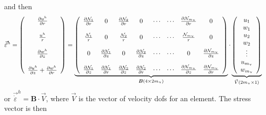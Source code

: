 and then 
\[
\vec{\dot\varepsilon}^h=
\left(
\begin{array}{c}
\frac{\partial u^h}{\partial r} \\ \\
\frac{u^h}{r} \\ \\
\frac{\partial w^h}{\partial z} \\ \\
\frac{\partial u^h}{\partial z} + \frac{\partial w^h}{\partial r} 
\end{array}
\right)
=
\underbrace{
\left(
\begin{array}{ccccccccc}
\frac{\partial {\mathcal{N}}_1}{\partial r} &  0 &  
\frac{\partial {\mathcal{N}}_2}{\partial r} &  0 & 
\cdots & \cdots &
\frac{\partial {\mathcal{N}}_{m_\upnu}}{\partial r} &  0 
\\  \\
\frac{{\mathcal{N}}_1}{r}  & 0 &  
\frac{{\mathcal{N}}_2}{r}  & 0 & 
\cdots & \cdots &
\frac{{\mathcal{N}}_{m_\upnu}}{r}  & 0  
\\  \\
0 & \frac{\partial {\mathcal{N}}_1}{\partial z}  &
0 & \frac{\partial {\mathcal{N}}_2}{\partial z}  &  
\cdots & \cdots &
0 & \frac{\partial {\mathcal{N}}_{m_\upnu}}{\partial z}   
\\ \\
\frac{\partial {\mathcal{N}}_1}{\partial z} & \frac{\partial {\mathcal{N}}_1}{\partial r}  &
\frac{\partial {\mathcal{N}}_2}{\partial z} & \frac{\partial {\mathcal{N}}_2}{\partial r}  & \cdots & \cdots &
\frac{\partial {\mathcal{N}}_{m_\upnu}}{\partial z} & \frac{\partial {\mathcal{N}}_{m_\upnu}}{\partial r}  
\end{array}
\right)
}_{\bm B (4\times 2 m_\upnu) }
\cdot
\underbrace{
\left(
\begin{array}{c}
u_1 \\  w_1 \\ u_2 \\  w_2  \\ \vdots \\ u_{m_\upnu} \\ w_{m_\upnu} 
\end{array}
\right)
}_{\vec V ( 2m_\upnu \times1)}
\]
or $\vec{\dot{\varepsilon}}^h= {\bm B} \cdot \vec{V}$, where $\vec{V}$ is the vector 
of velocity dofs for an element.
The stress vector is then 
